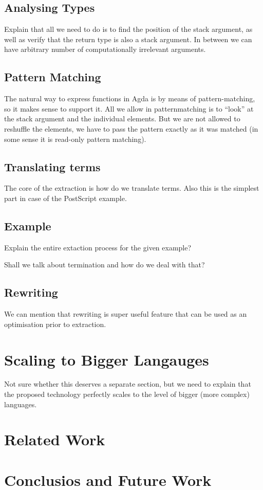 \documentclass[sigplan,anonymous,review]{acmart}
\begin{document}
\subsection{\label{sec:maptypes}Analysing Types}
Explain that all we need to do is to find the position of the stack argument, as well as
verify that the return type is also a stack argument.  In between we can have arbitrary
number of computationally irrelevant arguments.


\subsection{Pattern Matching}
The natural way to express functions in Agda is by means of pattern-matching, so it makes sense
to support it.  All we allow in patternmatching is to ``look'' at the stack argument and the
individual elements.  But we are not allowed to reshuffle the elements, we have to pass the
pattern exactly as it was matched (in some sense it is read-only pattern matching).

\subsection{Translating terms} \label{sec:translating-terms}
The core of the extraction is how do we translate terms.  Also this is the simplest part in
case of the PostScript example.

\subsection{Example}
Explain the entire extaction process for the given example?

Shall we talk about termination and how do we deal with that?


\subsection{\label{sec:rewriting}Rewriting}
We can mention that rewriting is super useful feature that can be used as an optimisation
prior to extraction.



\section{Scaling to Bigger Langauges}
Not sure whether this deserves a separate section, but we need to explain
that the proposed technology perfectly scales to the level of bigger (more complex)
languages.


\section{Related Work}

\section{Conclusios and Future Work}


\end{document}

